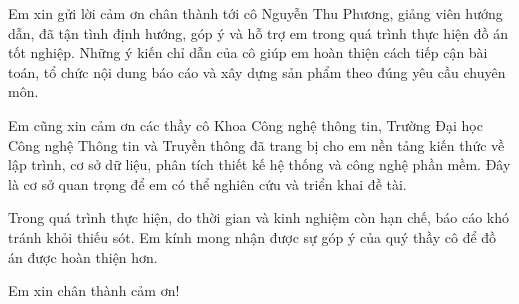\indent Em xin gửi lời cảm ơn chân thành tới cô Nguyễn Thu Phương, giảng viên hướng dẫn, đã tận tình định hướng, góp ý và hỗ trợ em trong quá trình thực hiện đồ án tốt nghiệp. Những ý kiến chỉ dẫn của cô giúp em hoàn thiện cách tiếp cận bài toán, tổ chức nội dung báo cáo và xây dựng sản phẩm theo đúng yêu cầu chuyên môn.

Em cũng xin cảm ơn các thầy cô Khoa Công nghệ thông tin, Trường Đại học Công nghệ Thông tin và Truyền thông đã trang bị cho em nền tảng kiến thức về lập trình, cơ sở dữ liệu, phân tích thiết kế hệ thống và công nghệ phần mềm. Đây là cơ sở quan trọng để em có thể nghiên cứu và triển khai đề tài.

Trong quá trình thực hiện, do thời gian và kinh nghiệm còn hạn chế, báo cáo khó tránh khỏi thiếu sót. Em kính mong nhận được sự góp ý của quý thầy cô để đồ án được hoàn thiện hơn.

Em xin chân thành cảm ơn!
